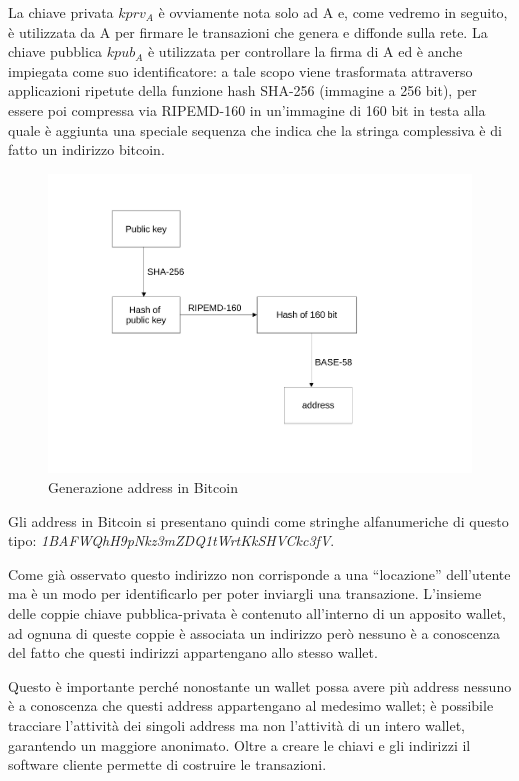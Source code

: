 La chiave privata $kprv_A$ è ovviamente nota solo ad A e, come vedremo in seguito, è utilizzata da A per ﬁrmare le transazioni che genera e diffonde sulla rete. La chiave pubblica $kpub_A$ è utilizzata per controllare la ﬁrma di A ed è anche impiegata come suo identiﬁcatore: a tale scopo viene trasformata attraverso applicazioni ripetute della funzione hash SHA-256 (immagine a 256 bit), per essere poi compressa via RIPEMD-160 in un’immagine di 160 bit in testa alla quale è aggiunta una speciale sequenza che indica che la stringa complessiva è di fatto un indirizzo bitcoin.
\begin{figure}[h!]
    \centering
    \includegraphics[scale=0.5, trim = 1cm 2cm 0cm 2cm, clip]{Images/address_gen.pdf}
    \caption{Generazione address in Bitcoin}
    \label{fig:sha-256_address}
\end{figure}
\FloatBarrier
Gli address in Bitcoin si presentano quindi come stringhe alfanumeriche di questo tipo: \textit{1BAFWQhH9pNkz3mZDQ1tWrtKkSHVCkc3fV}.

Come già osservato questo indirizzo non corrisponde a una “locazione” dell'utente ma è un modo per identiﬁcarlo per poter inviargli una transazione. L'insieme delle coppie chiave pubblica-privata è contenuto all'interno di un apposito wallet, ad ognuna di queste coppie è associata un indirizzo però nessuno è a conoscenza del fatto che questi indirizzi appartengano allo stesso wallet.

Questo è importante perché nonostante un wallet possa avere più address nessuno è a conoscenza che questi address appartengano al medesimo wallet; è possibile tracciare l’attività dei singoli address ma non l’attività di un intero wallet, garantendo un maggiore anonimato. Oltre a creare le chiavi e gli indirizzi il software cliente permette di costruire le transazioni.

